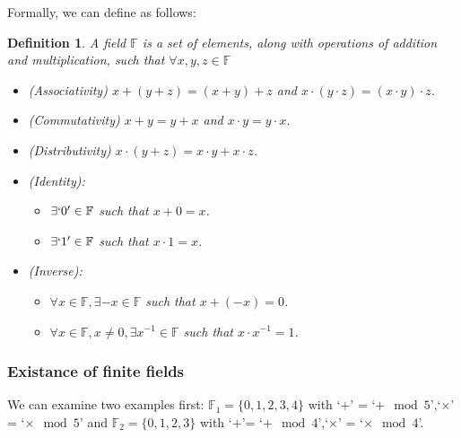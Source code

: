 \documentclass[letterpaper,12pt]{article}
\newtheorem{definition}{Definition}
\begin{document}
Formally, we can define as follows:\begin{definition}
    A field $\mathbb{F}$ is a set of elements, along with operations of addition and multiplication, such that $\forall x,y,z \in \mathbb{F}$\begin{itemize}
        \item (Associativity) $x+(y+z)=(x+y)+z$ and $x\cdot (y\cdot z)=(x\cdot y)\cdot z$.
        \item (Commutativity) $x+y=y+x$ and $x\cdot y=y\cdot x$.
        \item (Distributivity) $x\cdot (y+z)=x\cdot y+x\cdot z$.
        \item (Identity):\begin{itemize}
                  \item $\exists `0'\in \mathbb{F}$ such that $x+0=x$.
                  \item $\exists `1'\in \mathbb{F}$ such that $x\cdot 1=x$.
              \end{itemize}
        \item (Inverse):\begin{itemize}
                  \item $\forall x\in \mathbb{F}, \exists -x\in \mathbb{F}$ such that $x+(-x)=0$.
                  \item $\forall x\in \mathbb{F}, x\neq 0, \exists x^{-1}\in \mathbb{F}$ such that $x\cdot x^{-1}=1$.
              \end{itemize}
    \end{itemize}
\end{definition}
\subsubsection{Existance of finite fields}
We can examine two examples first: $\mathbb{F}_1 = \{0,1,2,3,4\}$ with `$+$' =
`$+\mod 5$',`$\times$' = `$\times\mod 5$' and $\mathbb{F}_2 = \{0,1,2,3\}$ with
`$+$'= `$+\mod 4$',`$\times$' = `$\times\mod 4$'.
\end{document}
